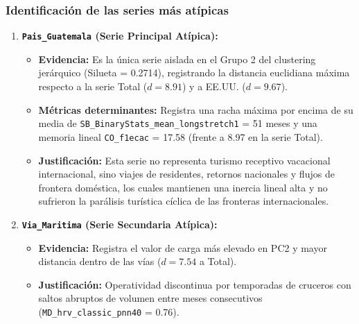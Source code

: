 \documentclass[11pt, a4paper]{article}
\begin{document}
\subsubsection{Identificación de las series más atípicas}
\begin{enumerate}
    \item \textbf{\texttt{Pais\_Guatemala} (Serie Principal Atípica):}
    \begin{itemize}
        \item \textbf{Evidencia:} Es la única serie aislada en el Grupo 2 del clustering jerárquico (Silueta = 0.2714), registrando la distancia euclidiana máxima respecto a la serie Total ($d = 8.91$) y a EE.UU. ($d = 9.67$).
        \item \textbf{Métricas determinantes:} Registra una racha máxima por encima de su media de \texttt{SB\_BinaryStats\_mean\_longstretch1} = 51 meses y una memoria lineal \texttt{CO\_f1ecac} = 17.58 (frente a 8.97 en la serie Total).
        \item \textbf{Justificación:} Esta serie no representa turismo receptivo vacacional internacional, sino viajes de residentes, retornos nacionales y flujos de frontera doméstica, los cuales mantienen una inercia lineal alta y no sufrieron la parálisis turística cíclica de las fronteras internacionales.
    \end{itemize}
    \item \textbf{\texttt{Via\_Maritima} (Serie Secundaria Atípica):}
    \begin{itemize}
        \item \textbf{Evidencia:} Registra el valor de carga más elevado en PC2 y mayor distancia dentro de las vías ($d = 7.54$ a Total).
        \item \textbf{Justificación:} Operatividad discontinua por temporadas de cruceros con saltos abruptos de volumen entre meses consecutivos (\texttt{MD\_hrv\_classic\_pnn40} = 0.76).
    \end{itemize}
\end{enumerate}
\end{document}
